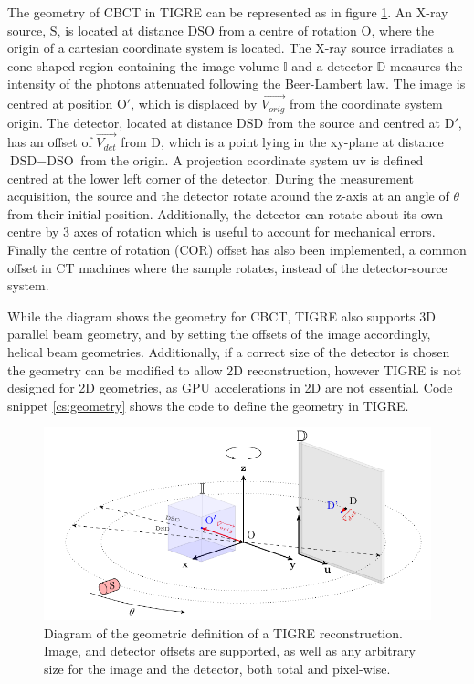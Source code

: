 The geometry of CBCT in TIGRE can be represented as in figure \ref{fig:geometryTIGRE}. An X-ray source, $\text{S}$, is located at distance $\text{DSO}$ from a centre of rotation $\text{O}$, where the origin of a cartesian coordinate system is located. The X-ray source irradiates a cone-shaped region containing the image volume $\mathbb{I}$ and a detector $\mathbb{D}$ measures the intensity of the photons attenuated following the Beer-Lambert law. The image is centred at position $\text{O}'$, which is displaced by $\overrightarrow{V_{orig}}$ from the coordinate system origin. The detector, located at distance $\text{DSD}$ from the source and centred at $\text{D}'$, has an offset of $\overrightarrow{V_{det}}$ from $\text{D}$, which is a point lying in the xy-plane at distance $\text{DSD}-\text{DSO}$ from the origin. A projection coordinate system uv is defined centred at the lower left corner of the detector. During the measurement acquisition, the source and the detector rotate around the z-axis at an angle of $\theta$ from their initial position. Additionally, the detector can rotate about its own centre by 3 axes of rotation which is useful to account for mechanical errors\cite{yang2006geometric}. Finally the centre of rotation (COR) offset has also been implemented, a common offset in CT machines where the sample rotates, instead of the detector-source system.

While the diagram shows the geometry for CBCT, TIGRE also supports 3D parallel beam geometry, and by setting the offsets of the image accordingly, helical beam geometries. Additionally, if a correct size of the detector is chosen the geometry can be modified to allow 2D reconstruction, however TIGRE is not designed for 2D geometries, as GPU accelerations in 2D are not essential. Code snippet \ref{cs:geometry} shows the code to define the geometry in TIGRE.

\begin{figure}
\begin{center}

\includegraphics{GPUmethods/geometrytikz-figure0.pdf} 
\end{center}

\caption[Diagram of the geometry of TIGRE]{\label{fig:geometryTIGRE} Diagram of the geometric definition of a TIGRE reconstruction. Image, and detector offsets are supported, as well as any arbitrary size for the image and the detector, both total and pixel-wise.} 
\end{figure}

